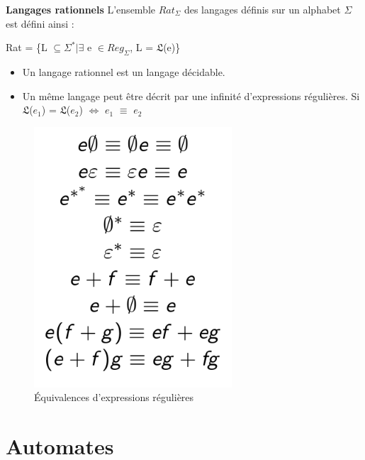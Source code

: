 \documentclass{article}
\begin{document}
\newpage
\textbf{Langages rationnels}\newline
L'ensemble $Rat_{\Sigma}$ des langages définis sur un alphabet $\Sigma$ est défini ainsi :
\begin{center}
    \item Rat = \{L $\subseteq \Sigma^{*} | \exists$ e $\in Reg_{\Sigma}$, L = $\mathfrak{L}$(e)\}
\end{center}
\begin{itemize}
    \item Un langage rationnel est un langage décidable.
    \item Un même langage peut être décrit par une infinité d'expressions régulières. Si $\mathfrak{L}$($e_{1}$) = $\mathfrak{L}$($e_{2}$) $\Longleftrightarrow$ $e_{1}$ $\equiv$ $e_{2}$
\end{itemize}
\begin{figure}[h]
    \centering
    \includegraphics[scale=0.3]{Image3.png}
    \caption{Équivalences d'expressions régulières}
\end{figure}
\newpage















\section{Automates}
\end{document}
